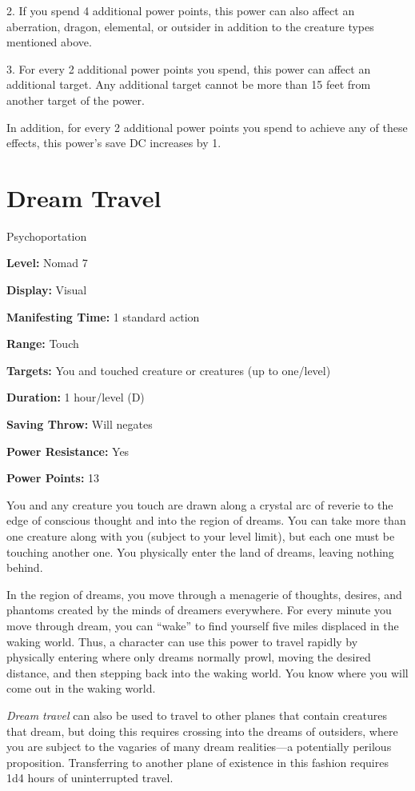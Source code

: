 \documentclass{article}
\begin{document}
2. If you spend 4 additional power points, this power can also affect an aberration, 
dragon, elemental, or outsider in addition to the creature types mentioned above.

3. For every 2 additional power points you spend, this power can affect an additional 
target. Any additional target cannot be more than 15 feet from another target of 
the power.

In addition, for every 2 additional power points you spend to achieve any of these 
effects, this power's save DC increases by 1.

\vspace{12pt}
\section*{Dream Travel}

Psychoportation

\textbf{Level:} Nomad 7

\textbf{Display:} Visual

\textbf{Manifesting Time:} 1 standard action

\textbf{Range:} Touch

\textbf{Targets:} You and touched creature or creatures (up to one/level)

\textbf{Duration:} 1 hour/level (D)

\textbf{Saving Throw:} Will negates

\textbf{Power Resistance:} Yes

\textbf{Power Points:} 13

You and any creature you touch are drawn along a crystal arc of reverie to the 
edge of conscious thought and into the region of dreams. You can take more than 
one creature along with you (subject to your level limit), but each one must be 
touching another one. You physically enter the land of dreams, leaving nothing 
behind.

In the region of dreams, you move through a menagerie of thoughts, desires, and 
phantoms created by the minds of dreamers everywhere. For every minute you move 
through dream, you can ``wake'' to find yourself five miles displaced in the waking 
world. Thus, a character can use this power to travel rapidly by physically entering 
where only dreams normally prowl, moving the desired distance, and then stepping 
back into the waking world. You know where you will come out in the waking world.

\textit{Dream travel }can also be used to travel to other planes that contain creatures 
that dream, but doing this requires crossing into the dreams of outsiders, where 
you are subject to the vagaries of many dream realities---a potentially perilous 
proposition. Transferring to another plane of existence in this fashion requires 
1d4 hours of uninterrupted travel.
\end{document}
